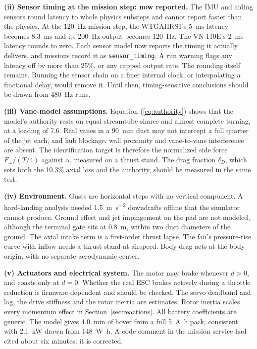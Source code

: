 \documentclass[journal]{IEEEtran}
\newcommand{\refeq}[1]{(\ref{#1})}
\newcommand{\refsec}[1]{Section~\ref{#1}}
\begin{document}
\textbf{(ii) Sensor timing at the mission step: now reported.}
The IMU and aiding sensors round latency to whole physics substeps and cannot report faster than the physics.
At the \SI{120}{\hertz} mission step, the WTGAHRS1's \SI{5}{\milli\second} latency becomes \SI{8.3}{\milli\second} and its \SI{200}{\hertz} output becomes \SI{120}{\hertz}.
The VN-110E's \SI{2}{\milli\second} latency rounds to zero.
Each sensor model now reports the timing it actually delivers, and missions record it as \texttt{sensor\_timing}.
A run warning flags any latency off by more than 25\%, or any capped output rate.
The rounding itself remains.
Running the sensor chain on a finer internal clock, or interpolating a fractional delay, would remove it.
Until then, timing-sensitive conclusions should be drawn from \SI{480}{\hertz} runs.

\textbf{(iii) Vane-model assumptions.}
Equation \refeq{eq:authority} shows that the model's authority rests on equal streamtube shares and almost complete turning, at a loading of 7.6.
Real vanes in a \SI{90}{\milli\metre} duct may not intercept a full quarter of the jet each, and hub blockage, wall proximity and vane-to-vane interference are absent.
The identification target is therefore the normalized side force $F_\perp/(T/4)$ against $\alpha$, measured on a thrust stand.
The drag fraction $\delta_D$, which sets both the 10.3\% axial loss and the authority, should be measured in the same test.

\textbf{(iv) Environment.}
Gusts are horizontal steps with no vertical component.
A hard-landing analysis needed \SI{1.5}{\metre\per\second\squared} downdrafts offline that the simulator cannot produce.
Ground effect and jet impingement on the pad are not modeled, although the terminal gate sits at \SI{0.8}{\metre}, within two duct diameters of the ground.
The axial intake term is a first-order thrust lapse.
The fan's pressure-rise curve with inflow needs a thrust stand at airspeed.
Body drag acts at the body origin, with no separate aerodynamic center.

\textbf{(v) Actuators and electrical system.}
The motor may brake whenever $d > 0$, and coasts only at $d = 0$.
Whether the real ESC brakes actively during a throttle reduction is firmware-dependent and should be checked.
The servo deadband and lag, the drive stiffness and the rotor inertia are estimates.
Rotor inertia scales every momentum effect in \refsec{sec:reactions}.
All battery coefficients are generic.
The model gives \SI{4.0}{\minute} of hover from a full \SI{5}{\ampere\hour} pack, consistent with \SI{2.1}{\kilo\watt} drawn from \SI{148}{\watt\hour}.
A code comment in the mission service had cited about six minutes; it is corrected.
\end{document}
